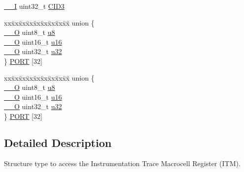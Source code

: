 \begin{DoxyCompactItemize}
\item 
\mbox{\hyperlink{core__sc300_8h_af63697ed9952cc71e1225efe205f6cd3}{\+\_\+\+\_\+I}} uint32\+\_\+t \mbox{\hyperlink{struct_i_t_m___type_acb2fedfd1da6ff2a57d25fec513ffe25}{C\+I\+D3}}
\item 
\begin{tabbing}
xx\=xx\=xx\=xx\=xx\=xx\=xx\=xx\=xx\=\kill
union \{\\
\>\mbox{\hyperlink{core__sc300_8h_a7e25d9380f9ef903923964322e71f2f6}{\_\_O}} uint8\_t \mbox{\hyperlink{struct_i_t_m___type_a0374c0b98ab9de6f71fabff7412df832}{u8}}\\
\>\mbox{\hyperlink{core__sc300_8h_a7e25d9380f9ef903923964322e71f2f6}{\_\_O}} uint16\_t \mbox{\hyperlink{struct_i_t_m___type_ae8d499140220fa6d4eab1da7262bf08e}{u16}}\\
\>\mbox{\hyperlink{core__sc300_8h_a7e25d9380f9ef903923964322e71f2f6}{\_\_O}} uint32\_t \mbox{\hyperlink{struct_i_t_m___type_acaf6d0e14a3d4b541c624913b4a1931e}{u32}}\\
\} \mbox{\hyperlink{struct_i_t_m___type_a4fb8d5beccf8bf958357bf9d59856f05}{PORT}} \mbox{[}32\mbox{]}\\

\end{tabbing}\item 
\begin{tabbing}
xx\=xx\=xx\=xx\=xx\=xx\=xx\=xx\=xx\=\kill
union \{\\
\>\mbox{\hyperlink{core__sc300_8h_a7e25d9380f9ef903923964322e71f2f6}{\_\_O}} uint8\_t \mbox{\hyperlink{struct_i_t_m___type_a0374c0b98ab9de6f71fabff7412df832}{u8}}\\
\>\mbox{\hyperlink{core__sc300_8h_a7e25d9380f9ef903923964322e71f2f6}{\_\_O}} uint16\_t \mbox{\hyperlink{struct_i_t_m___type_ae8d499140220fa6d4eab1da7262bf08e}{u16}}\\
\>\mbox{\hyperlink{core__sc300_8h_a7e25d9380f9ef903923964322e71f2f6}{\_\_O}} uint32\_t \mbox{\hyperlink{struct_i_t_m___type_acaf6d0e14a3d4b541c624913b4a1931e}{u32}}\\
\} \mbox{\hyperlink{struct_i_t_m___type_aa6d310cc8eabd3413456ed2c6d28435e}{PORT}} \mbox{[}32\mbox{]}\\

\end{tabbing}\end{DoxyCompactItemize}


\subsection{Detailed Description}
Structure type to access the Instrumentation Trace Macrocell Register (I\+TM). 

